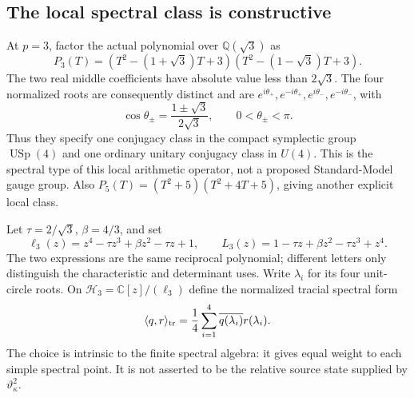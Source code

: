\documentclass[11pt]{article}
\theoremstyle{definition}
\theoremstyle{remark}
\newcommand{\C}{\mathbb C}
\newcommand{\Q}{\mathbb Q}
\newcommand{\ip}[2]{\langle#1,#2\rangle}
\begin{document}
\subsection{The local spectral class is constructive}
At $p=3$, factor the actual polynomial over $\Q(\sqrt3)$ as
\begin{equation}
 P_3(T)=
 (T^2-(1+\sqrt3)T+3)(T^2-(1-\sqrt3)T+3).
 \label{eq:v5-P3-factor}
\end{equation}
The two real middle coefficients have absolute value less than $2\sqrt3$.
The four normalized roots are consequently distinct and are
$e^{i\theta_+},e^{-i\theta_+},e^{i\theta_-},e^{-i\theta_-}$, with
\begin{equation}
 \cos\theta_\pm=\frac{1\pm\sqrt3}{2\sqrt3},\qquad 0<\theta_\pm<\pi.
 \label{eq:v5-angles}
\end{equation}
Thus they specify one conjugacy class in the compact symplectic group
$\operatorname{USp}(4)$ and one ordinary unitary conjugacy class in $U(4)$.
This is the spectral type of this local arithmetic operator, not a proposed
Standard-Model gauge group. Also
$P_5(T)=(T^2+5)(T^2+4T+5)$, giving another explicit local class.

Let $\tau=2/\sqrt3$, $\beta=4/3$, and set
\begin{equation}
 \ell_3(z)=z^4-\tau z^3+\beta z^2-\tau z+1,
 \qquad L_3(z)=1-\tau z+\beta z^2-\tau z^3+z^4.
 \label{eq:v5-normalized-polynomial}
\end{equation}
The two expressions are the same reciprocal polynomial; different
letters only distinguish the characteristic and determinant uses.
Write $\lambda_i$ for its four unit-circle roots. On
$\mathscr H_3=\C[z]/(\ell_3)$ define the normalized tracial spectral form
\begin{equation}
 \ip{q}{r}_{\rm tr}=\frac14\sum_{i=1}^4
       \overline{q(\lambda_i)}r(\lambda_i).
 \label{eq:v5-trace-form}
\end{equation}
The choice is intrinsic to the finite spectral algebra: it gives equal
weight to each simple spectral point. It is not asserted to be the
relative source state supplied by $\vartheta_\kappa^2$.
\end{document}
